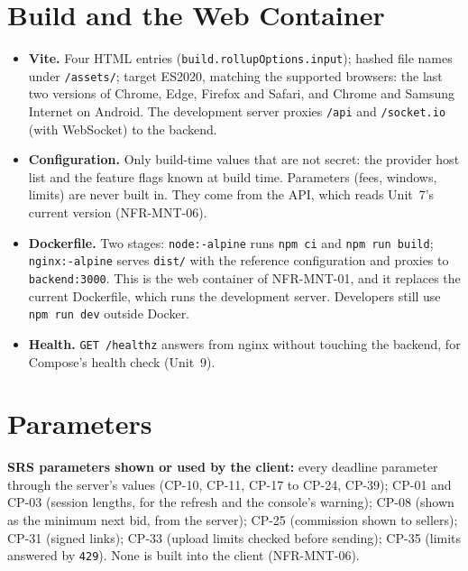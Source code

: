 \documentclass[11pt,a4paper]{article}
\begin{document}
\section{Build and the Web Container}
\label{sec:build}
\begin{itemize}[nosep]
  \item \textbf{Vite.} Four HTML entries (\texttt{build.rollupOptions.input}); hashed file names under \texttt{/assets/}; target ES2020, matching the supported browsers: the last two versions of Chrome, Edge, Firefox and Safari, and Chrome and Samsung Internet on Android. The development server proxies \texttt{/api} and \texttt{/socket.io} (with WebSocket) to the backend.
  \item \textbf{Configuration.} Only build-time values that are not secret: the provider host list and the feature flags known at build time. Parameters (fees, windows, limits) are never built in. They come from the API, which reads Unit~7's current version (NFR-MNT-06).
  \item \textbf{Dockerfile.} Two stages: \texttt{node:-alpine} runs \texttt{npm ci} and \texttt{npm run build}; \texttt{nginx:-alpine} serves \texttt{dist/} with the reference configuration and proxies to \texttt{backend:3000}. This is the web container of NFR-MNT-01, and it replaces the current Dockerfile, which runs the development server. Developers still use \texttt{npm run dev} outside Docker.
  \item \textbf{Health.} \texttt{GET /healthz} answers from nginx without touching the backend, for Compose's health check (Unit~9).
\end{itemize}
\section{Parameters}
\textbf{SRS parameters shown or used by the client:} every deadline parameter through the server's values (CP-10, CP-11, CP-17 to CP-24, CP-39); CP-01 and CP-03 (session lengths, for the refresh and the console's warning); CP-08 (shown as the minimum next bid, from the server); CP-25 (commission shown to sellers); CP-31 (signed links); CP-33 (upload limits checked before sending); CP-35 (limits answered by \texttt{429}). None is built into the client (NFR-MNT-06).
\end{document}
